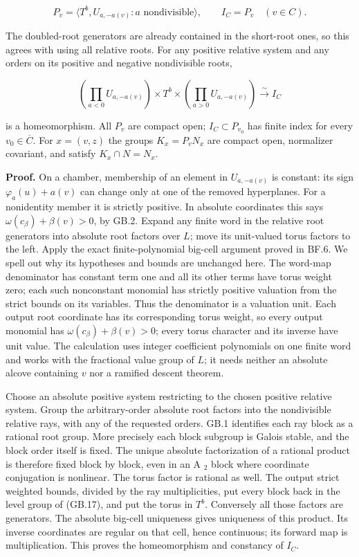 \documentclass[
  11pt,
]{article}
\begin{document}
\[
 P_v=\langle T^b,U_{a,-a(v)}:a\text{ nondivisible}\rangle,
 \qquad I_C=P_v\quad(v\in C).
 \tag{GB.16}
\]

The doubled-root generators are already contained in the short-root
ones, so this agrees with using all relative roots. For any positive
relative system and any orders on its positive and negative nondivisible
roots,

\[
 \left(\prod_{a<0}U_{a,-a(v)}\right)\times T^b\times
 \left(\prod_{a>0}U_{a,-a(v)}\right)\xrightarrow{\sim} I_C
 \tag{GB.17}
\]

is a homeomorphism. All \(P_v\) are compact open; \(I_C\subset P_{v_0}\)
has finite index for every \(v_0\in\overline C\). For \(x=(v,z)\) the
groups \(K_x=P_vN_x\) are compact open, normalizer covariant, and
satisfy \(K_x\cap N=N_x\).

\textbf{Proof.} On a chamber, membership of an element in
\(U_{a,-a(v)}\) is constant: its sign \(\varphi_a(u)+a(v)\) can change
only at one of the removed hyperplanes. For a nonidentity member it is
strictly positive. In absolute coordinates this says
\(\omega(c_\beta)+\beta(v)>0\), by GB.2. Expand any finite word in the
relative root generators into absolute root factors over \(L\); move its
unit-valued torus factors to the left. Apply the exact finite-polynomial
big-cell argument proved in BF.6. We spell out why its hypotheses and
bounds are unchanged here. The word-map denominator has constant term
one and all its other terms have torus weight zero; each such
nonconstant monomial has strictly positive valuation from the strict
bounds on its variables. Thus the denominator is a valuation unit. Each
output root coordinate has its corresponding torus weight, so every
output monomial has \(\omega(c_\beta)+\beta(v)>0\); every torus
character and its inverse have unit value. The calculation uses integer
coefficient polynomials on one finite word and works with the fractional
value group of \(L\); it needs neither an absolute alcove containing
\(v\) nor a ramified descent theorem.

Choose an absolute positive system restricting to the chosen positive
relative system. Group the arbitrary-order absolute root factors into
the nondivisible relative rays, with any of the requested orders. GB.1
identifies each ray block as a rational root group. More precisely each
block subgroup is Galois stable, and the block order itself is fixed.
The unique absolute factorization of a rational product is therefore
fixed block by block, even in an A \(_2\) block where coordinate
conjugation is nonlinear. The torus factor is rational as well. The
output strict weighted bounds, divided by the ray multiplicities, put
every block back in the level group of (GB.17), and put the torus in
\(T^b\). Conversely all those factors are generators. The absolute
big-cell uniqueness gives uniqueness of this product. Its inverse
coordinates are regular on that cell, hence continuous; its forward map
is multiplication. This proves the homeomorphism and constancy of
\(I_C\).
\end{document}
